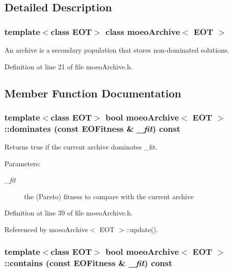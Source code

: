 \subsection{Detailed Description}
\subsubsection*{template$<$class EOT$>$ class moeo\-Archive$<$ EOT $>$}

An archive is a secondary population that stores non-dominated solutions. 



Definition at line 21 of file moeo\-Archive.h.

\subsection{Member Function Documentation}
\subsubsection{\setlength{\rightskip}{0pt plus 5cm}template$<$class EOT$>$ bool {\bf moeo\-Archive}$<$ EOT $>$::dominates (const {\bf EOFitness} \& {\em \_\-fit}) const\hspace{0.3cm}{\tt  [inline]}}\label{classmoeoArchive_7786c8bfe67fefa19ac31a4ac700df06}


Returns true if the current archive dominates \_\-fit. 

\begin{Desc}
\item[Parameters:]
\begin{description}
\item[{\em \_\-fit}]the (Pareto) fitness to compare with the current archive \end{description}
\end{Desc}


Definition at line 39 of file moeo\-Archive.h.

Referenced by moeo\-Archive$<$ EOT $>$::update().
\subsubsection{\setlength{\rightskip}{0pt plus 5cm}template$<$class EOT$>$ bool {\bf moeo\-Archive}$<$ EOT $>$::contains (const {\bf EOFitness} \& {\em \_\-fit}) const\hspace{0.3cm}{\tt  [inline]}}\label{classmoeoArchive_71feaf270daa7185e829caef40bbf956}


